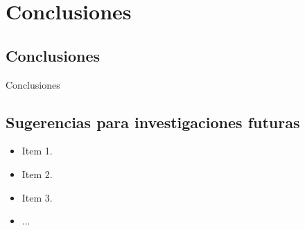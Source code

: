 \chapter{Conclusiones}
\label{cap:conclusiones}

\section{Conclusiones} 

Conclusiones



\section{Sugerencias para investigaciones futuras} 

\begin{itemize}
	\item Item 1.
	\item Item 2.
	\item Item 3.
	\item ...
\end{itemize}

